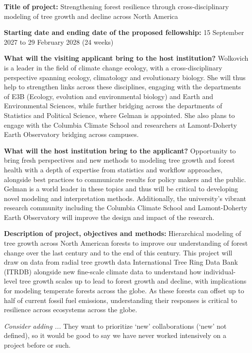 \documentclass[11pt]{article}
\begin{document}
\renewcommand{\refname}{\CHead{}}


{\bf Title of project:} Strengthening forest resilience through cross-disciplinary modeling of tree growth and decline across North America 

{\bf Starting date and ending date of the proposed fellowship:} 15 September 2027 to 29 February 2028 (24 weeks)

{\bf What will the visiting applicant bring to the host institution?} Wolkovich is a leader in the field of climate change ecology, with a cross-disciplinary perspective spanning ecology, climatology and evolutionary biology. She will thus help to strengthen links across these disciplines,  engaging with the departments of E3B (Ecology, evolution and environmental biology) and Earth and Environmental Sciences, while further bridging across the departments of Statistics and Political Science, where Gelman is appointed. She also plans to engage with the Columbia Climate School and researchers at Lamont-Doherty Earth Observatory bridging across campuses.

{\bf What will the host institution bring to the applicant?} Opportunity to bring fresh perspectives and new methods to modeling tree growth and forest health with a depth of expertise from statistics and workflow approaches, alongside best practices to communicate results for policy makers and the public. Gelman is a world leader in these topics and thus will be critical to developing novel modeling and interpretation methods. Additionally, the university's vibrant research community including the Columbia Climate School and Lamont-Doherty Earth Observatory will improve the design and impact of the research.

{\bf Description of project, objectives and methods:} Hierarchical modeling of tree growth across North American forests to improve our understanding of forest change over the last century and to the end of this century. This project will draw on data from radial tree growth data International Tree Ring Data Bank (ITRDB) alongside new fine-scale climate data to understand how individual-level tree growth scales up to lead to forest growth and decline, with implications for modeling temperate forests across the globe. As these forests can offset up to half of current fossil fuel emissions, understanding their responses is critical to resilience across ecosystems across the globe. 

\emph{Consider adding ...} They want to prioritize `new' collaborations (`new' not defined), so it would be good to say we have never worked intensively on a project before or such. 
\end{document}
